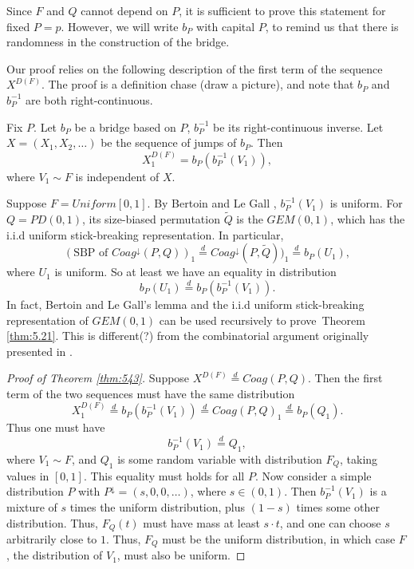 Since $F$ and $Q$ cannot depend on $P$, it is sufficient to prove this statement for fixed $P = p$. However, we will write $b_P$ with capital $P$, to remind us that there is randomness in the construction of the bridge.

Our proof relies on the following description of the first term of the sequence $X^{D(F)}$. The proof is a definition chase (draw a picture), and note that $b_P$ and $b_P^{-1}$ are both right-continuous. 

\begin{lemma}
Fix $P$. Let $b_P$ be a bridge based on $P$, $b_P^{-1}$ be its right-continuous inverse. Let $X = (X_1, X_2, \ldots)$ be the sequence of jumps of $b_P$. Then 
\begin{equation}\label{eqn:df1}
X^{D(F)}_1 = b_P(b_P^{-1}(V_1)),
\end{equation}
where $V_1 \sim F$ is independent of $X$. %
\end{lemma}

\begin{example}
Suppose $F = Uniform[0,1]$. By Bertoin and Le Gall \cite{MR1990057}, $b_P^{-1}(V_1)$ is uniform. For $Q = PD(0,1)$, its size-biased permutation $\tilde{Q}$ is the $GEM(0,1)$, which has the i.i.d uniform stick-breaking representation. In particular, 
$$ (\mbox{SBP of } Coag^\downarrow(P,Q))_1 \stackrel{d}{=} Coag^\downarrow(P,\tilde{Q}))_1 \stackrel{d}{=} b_P(U_1), $$
where $U_1$ is uniform. So at least we have an equality in distribution
$$ b_P(U_1) \stackrel{d}{=} b_P(b_P^{-1}(V_1)). $$
In fact, Bertoin and Le Gall's lemma and the i.i.d uniform stick-breaking representation of $GEM(0,1)$ can be used recursively to prove~Theorem \ref{thm:5.21}. This is different(?) from the combinatorial argument originally presented in \cite{MR2245368}.
\end{example}

\begin{proof}[Proof of Theorem \ref{thm:543}] 
Suppose $X^{D(F)} \stackrel{d}{=} Coag(P, Q)$. Then the first term of the two sequences must have the same distribution
$$X^{D(F)}_1 \stackrel{d}{=} b_P(b_P^{-1}(V_1)) \stackrel{d}{=} Coag(P, Q)_1 \stackrel{d}{=} b_P(Q_1).$$ 
Thus one must have 
$$b_P^{-1}(V_1) \stackrel{d}{=} Q_1,$$ 
where $V_1 \sim F$, and $Q_1$ is some random variable with distribution $F_Q$, taking values in $[0,1]$. This equality must holds for all $P$. Now consider a simple distribution $P$ with $P^\downarrow = (s, 0, 0, \ldots)$, where $s \in (0,1)$. Then $b_P^{-1}(V_1)$ is a mixture of $s$ times the uniform distribution, plus $(1-s)$ times some other distribution. Thus, $F_Q(t)$ must have mass at least $s \cdot t$, and one can choose $s$ arbitrarily close to $1$. Thus, $F_Q$ must be the uniform distribution, in which case $F$, the distribution of $V_1$, must also be uniform. 
\end{proof}





